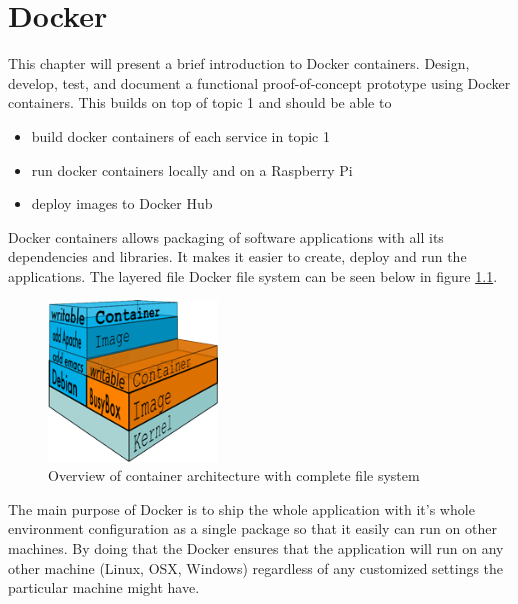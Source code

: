 \chapter{Docker}\label{ch:docker}
This chapter will present a brief introduction to Docker containers.  Design, develop, test, and document a functional proof-of-concept prototype using Docker containers. This builds on top of topic 1 and should be able to

\begin{itemize}
\item build docker containers of each service in topic 1
\item run docker containers locally and on a Raspberry Pi
\item deploy images to Docker Hub
\end{itemize}


Docker containers allows packaging of software applications with all its dependencies and libraries. It makes it easier to create, deploy and run the applications. The layered file Docker file system can be seen below in figure \ref{fig:filesystem}.

\begin{figure}[bth]
  \centering

      \includegraphics[width=0.4\textwidth]{gfx/what_is_layered_filesystems_sm}
  \caption{Overview of container architecture with complete file system }
  \label{fig:filesystem}
  
\end{figure}




The main purpose of Docker is to ship the whole application with it's whole environment configuration as a single package so that it easily can run on other machines. 
By doing that the Docker ensures that the application will run on any other machine (Linux, OSX, Windows) regardless of any customized settings the particular machine might have.


